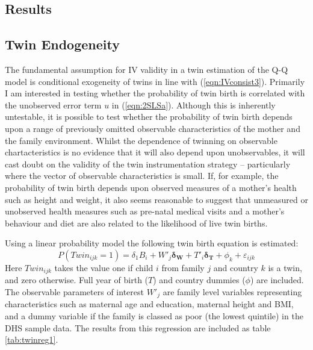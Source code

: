 \documentclass{article}[11pt,subeqn]
\newcommand{\vect}[1]{\mathbf{#1}}
\begin{document}
\begin{spacing}{1.5}
  
\section{Results}
\label{scn:results}
\subsection{Twin Endogeneity}
\label{scn:twinendog}
The fundamental assumption for IV validity in a twin estimation of the Q-Q model is conditional exogeneity of twins in line with (\ref{eqn:IVconsist3}).
Primarily I am interested in testing whether the probability of twin birth is correlated with the unobserved error term $u$ in (\ref{eqn:2SLSa}).  
Although this is inherently untestable, it is possible to test whether the probability of twin birth depends upon a range of previously omitted observable 
characteristics of the mother and the family environment.  Whilst the dependence of twinning on observable chartacteristics is no evidence that it will also 
depend upon unobservables, it will cast doubt on the validity of the twin instrumentation strategy -- particularly where the vector of observable 
characteristics is small.  If, for example, the probability of twin birth depends upon observed measures of a mother's health such as height and weight, 
it also seems reasonable to suggest that unmeasured or unobserved health measures such as pre-natal medical visits and a mother's behaviour and diet
are also related to the likelihood of live twin births. 
 
Using a linear probability model the following twin birth equation is estimated: 
\begin{equation}
\label{eqn:twinpred}
P(Twin_{ijk}=1)=\delta_1 B_i + W'_j\vect{\delta_\vect{W}}+ T'_{i}\vect{\delta_\vect{T}} +  \phi_k + \varepsilon_{ijk}
\end{equation}
Here $Twin_{ijk}$ takes the value one if child $i$ from family $j$ and country $k$ is a twin, and zero otherwise.  Full year of birth ($T$) and country
dummies ($\phi$) are included.  The observable parameters of interest $W'_j$ are family level variables representing characteristics such as maternal age and
education, maternal height and BMI, and a dummy variable if the family is classed as poor (the lowest quintile) in the DHS sample data. The results from this 
regression are included as table \ref{tab:twinreg1}.


\end{spacing}
\end{document}
